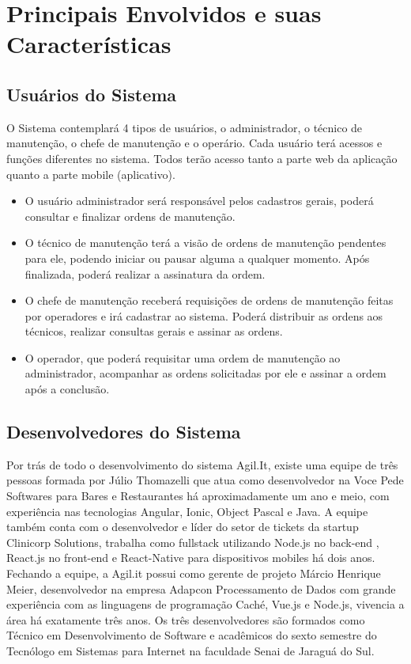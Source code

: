 \section{Principais Envolvidos e suas Características}

\subsection{Usuários do Sistema}
O Sistema contemplará 4 tipos de usuários, o administrador, o técnico de manutenção, o chefe de manutenção e o operário. Cada usuário terá acessos e funções diferentes no sistema. Todos terão acesso tanto a parte web da aplicação quanto a parte mobile (aplicativo).

\begin{itemize}
	
	\item O usuário administrador será responsável pelos cadastros gerais, poderá consultar e finalizar ordens de manutenção.
	
	\item O técnico de manutenção terá a visão de ordens de manutenção pendentes para ele, podendo iniciar ou pausar alguma a qualquer momento. Após finalizada, poderá realizar a assinatura da ordem.
	
	\item O chefe de manutenção receberá requisições de ordens de manutenção feitas por operadores e irá cadastrar ao sistema. Poderá distribuir as ordens aos técnicos, realizar consultas gerais e assinar as ordens.
	
	\item O operador, que poderá requisitar uma ordem de manutenção ao administrador, acompanhar as ordens solicitadas por ele e assinar a ordem após a conclusão.
	
\end{itemize}
\subsection{Desenvolvedores do Sistema}

Por trás de todo o desenvolvimento do sistema Agil.It, existe uma equipe de três pessoas formada por Júlio Thomazelli que atua como desenvolvedor na Voce Pede Softwares para Bares e Restaurantes há aproximadamente um ano e meio, com experiência nas tecnologias Angular, Ionic, Object Pascal e Java. A equipe também conta com o desenvolvedor e líder do setor de tickets da startup Clinicorp Solutions, trabalha como fullstack utilizando Node.js no back-end , React.js no front-end e React-Native para dispositivos mobiles há dois anos. Fechando a equipe, a Agil.it possui como gerente de projeto Márcio Henrique Meier, desenvolvedor na empresa Adapcon Processamento de Dados com grande experiência com as linguagens de programação Caché, Vue.js e Node.js, vivencia a área há exatamente três anos.
Os três desenvolvedores são formados como Técnico em Desenvolvimento de Software e acadêmicos do sexto semestre do Tecnólogo em Sistemas para Internet na faculdade Senai de Jaraguá do Sul.

